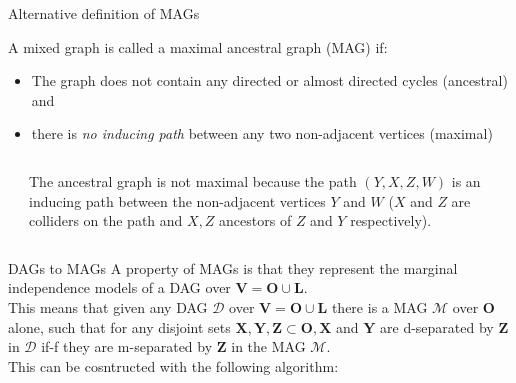 \documentclass[english, compress, red]{beamer}
\begin{document}
\begin{frame}{Alternative definition of MAGs}
	\begin{definition}A mixed graph is called a maximal ancestral graph (MAG) if:
		\begin{itemize}
			\item The graph does not contain any directed or almost directed cycles (ancestral) and
			\item there is \textit{no inducing path} between any two non-adjacent vertices (maximal)
		\end{itemize}
	\end{definition}
	\vspace{3pt}
	\begin{columns}
		\begin{column}{0.3\textwidth}
		\end{column}
	\begin{column}{0.7\textwidth}
		The ancestral graph is not maximal because the path $(Y,X,Z,W)$ is an inducing path between the non-adjacent vertices $Y$ and $W$ ($X$ and $Z$ are colliders on the path and $X,Z$ ancestors of $Z$ and $Y$ respectively).
	\end{column}
	\end{columns}
\end{frame}

\begin{frame}{DAGs to MAGs}
	A property of MAGs is that they represent the marginal independence models of a DAG over $\mathbf{V} = \mathbf{O} \cup \mathbf{L}$. \\
		
	This means that given any DAG $\mathcal{D}$ over $\mathbf{V} = \mathbf{O}\cup \mathbf{L}$ there is a MAG $\mathcal{M}$ over $\mathbf{O}$ alone, such that for any disjoint sets $\mathbf{X, Y, Z \subset O, X}$ and $\mathbf{Y}$ are d-separated by $\mathbf{Z}$ in $\mathcal{D}$ if-f they are m-separated by $\mathbf{Z}$ in the MAG $\mathcal{M}$. \\
		
	This can be cosntructed with the following algorithm:
\end{frame}
\end{document}
